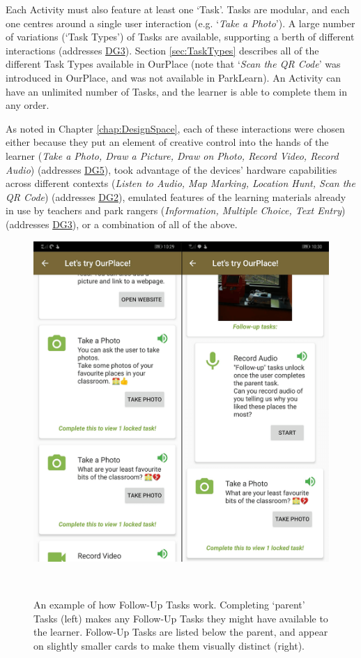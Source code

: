 Each Activity must also feature at least one `Task'. Tasks are modular, and each one centres around a single user interaction (e.g. `\textit{Take a Photo}'). A large number of variations (`Task Types') of Tasks are available, supporting a berth of different interactions (addresses \hyperref[DG3]{DG3}). Section \ref{sec:TaskTypes} describes all of the different Task Types available in OurPlace (note that `\textit{Scan the QR Code}' was introduced in OurPlace, and was not available in ParkLearn). An Activity can have an unlimited number of Tasks, and the learner is able to complete them in any order.

As noted in Chapter \ref{chap:DesignSpace}, each of these interactions were chosen either because they put an element of creative control into the hands of the learner (\textit{Take a Photo, Draw a Picture, Draw on Photo, Record Video, Record Audio}) (addresses \hyperref[DG5]{DG5}), took advantage of the devices’ hardware capabilities across different contexts (\textit{Listen to Audio, Map Marking, Location Hunt, Scan the QR Code}) (addresses \hyperref[DG2]{DG2}), emulated features of the learning materials already in use by teachers and park rangers (\textit{Information, Multiple Choice, Text Entry}) (addresses \hyperref[DG3]{DG3}), or a combination of all of the above.

\begin{figure}
  \centering
  \includegraphics[width=0.8\columnwidth]{images/chapter05/FollowUpTasks.png}
  \caption[Follow-Up Task example]{An example of how Follow-Up Tasks work. Completing `parent' Tasks (left) makes any Follow-Up Tasks they might have available to the learner. Follow-Up Tasks are listed below the parent, and appear on slightly smaller cards to make them visually distinct (right). }~\label{fig:FollowUpTasks}
\end{figure}

